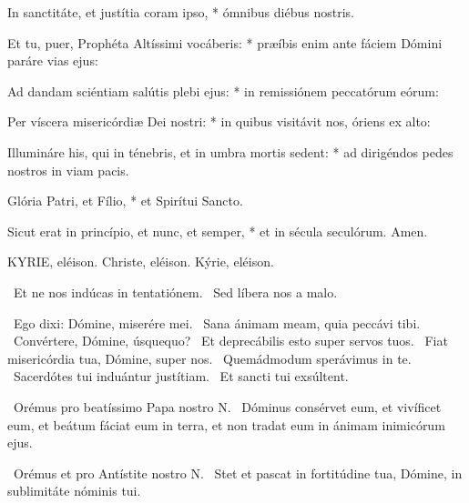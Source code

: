 In sanctitáte, et justítia coram ipso, * ómnibus diébus nostris.

Et tu, puer, Prophéta Altíssimi vocáberis: * præíbis enim ante fáciem Dómini paráre vias ejus:

Ad dandam sciéntiam salútis plebi ejus: * in remissiónem peccatórum eórum:

Per víscera misericórdiæ Dei nostri: * in quibus visitávit nos, óriens ex alto:

Illumináre his, qui in ténebris, et in umbra mortis sedent: * ad dirigéndos pedes nostros in viam pacis.

Glória Patri, et Fílio, * et Spirítui Sancto.

Sicut erat in princípio, et nunc, et semper, * et in sécula seculórum. Amen.




KYRIE, eléison. Christe, eléison. Kýrie, eléison.

 \V\ Et ne nos indúcas in tentatiónem. \R\ Sed líbera nos a malo.

\V\ Ego dixi: Dómine, miserére mei. \R\ Sana ánimam meam, quia peccávi tibi. \V\ Convértere, Dómine, úsquequo? \R\ Et deprecábilis esto super servos tuos. \V\ Fiat misericórdia tua, Dómine, super nos. \R\ Quemádmodum sperávimus in te. \V\ Sacerdótes tui induántur justítiam. \R\ Et sancti tui exsúltent.

\V\ Orémus pro beatíssimo Papa nostro N. \R\ Dóminus consérvet eum, et vivíficet eum, et beátum fáciat eum in terra, et non tradat eum in ánimam inimicórum ejus.

\V\ Orémus et pro Antístite nostro N. \R\ Stet et pascat in fortitúdine tua, Dómine, in sublimitáte nóminis tui.

